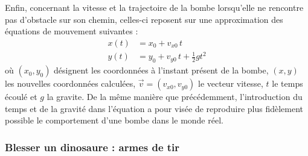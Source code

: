 \documentclass[11pt,a4paper]{article}
\begin{document}
Enfin, concernant la vitesse et la trajectoire de la bombe lorsqu'elle ne rencontre pas d'obstacle sur son chemin, celles-ci reposent sur une approximation des équations de mouvement suivantes : 
\begin{equation}
\begin{aligned}
x(t) &= x_0 + v_{x0}\,t\\
y(t) &= y_0 + v_{y0}\,t + \frac{1}{2} g t^2
\end{aligned}
\label{eq:formuleMouvementBombe}
\end{equation}
où  $(x_0,y_0)$ désignent les coordonnées à l'instant présent de la bombe, $(x,y)$ les nouvelles coordonnées calculées, $\vec{v}=(v_{x0},v_{y0})$ le vecteur vitesse, $t$ le temps écoulé et $g$ la \gls{gravite}.
De la même manière que précédemment, l'introduction du temps et de la gravité dans l'équation a pour visée de reproduire plus fidèlement possible le comportement d'une bombe dans le monde réel.

\subsubsection{Blesser un dinosaure : armes de tir}
\end{document}
